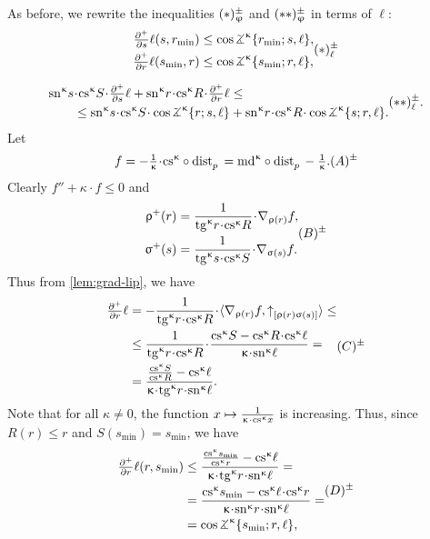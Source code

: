 As before, we rewrite the inequalities $(*)^{\pm}_\upvarphi$ and $(**)^{\pm}_\upvarphi$ in terms of $\ell$:
\[
\begin{aligned}
\tfrac{\partial^+}{\partial s}\ell(s,r_{\min})
&\le 
\cos\tangle\mc\kappa\{r_{\min};s,\ell\},
\\
\tfrac{\partial^+}{\partial r}\ell(s_{\min},r)
&\le 
\cos\tangle\mc\kappa\{s_{\min};r,\ell\},
\end{aligned}
\leqno(*)\mc\pm_\ell
\]

\[
\begin{aligned}
\sn\kappa s&\cdot\cs\kappa S\cdot\tfrac{\partial^+}{\partial s}\ell
+
\sn\kappa r\cdot\cs\kappa R\cdot\tfrac{\partial^+}{\partial r}\ell\le 
\\
&\le\sn\kappa s\cdot\cs\kappa S\cdot\cos\tangle\mc\kappa\{r;s,\ell\}
+
\sn\kappa r\cdot\cs\kappa R\cdot\cos\tangle\mc\kappa\{s;r,\ell\}.
\end{aligned}
\leqno(**)\mc\pm_\ell.
\]
Let
\[f=-\tfrac{1}{\kappa}\cdot\cs\kappa\circ\distfun{p}{}{}
=
\md\kappa\circ\distfun{p}{}{}-\tfrac{1}{\kappa}.\leqno(A)\mc\pm\]
Clearly $f''+\kappa\cdot  f\le 0$ and
\[
\begin{aligned}
\rho^+(r)&=\frac{1}{\tang\kappa r\cdot\cs\kappa R}\cdot\nabla_{\rho(r)} f,
\\
\sigma^+(s)&=\frac{1}{\tang\kappa s\cdot\cs\kappa S}\cdot\nabla_{\sigma(s)} f.
\end{aligned}
\leqno(B)\mc\pm\]
Thus from \ref{lem:grad-lip}, we have
\[\begin{aligned}
\tfrac{\partial^+}{\partial r}\ell
&=
-\frac{1}{\tang\kappa r\cdot\cs\kappa R}
\cdot
\<\nabla_{\rho(r)} f,\dir{\rho(r)}{\sigma(s)}\>
\le
\\
&\le
\frac
{1}
{\tang\kappa r\cdot\cs\kappa R}
\cdot
\frac
{\cs\kappa S-\cs\kappa R\cdot\cs\kappa\ell}
{\kappa\cdot\sn\kappa\ell}
=
\\
&=
\frac
{\frac{\cs\kappa S}{\cs\kappa R}-\cs\kappa\ell}
{\kappa\cdot\tang\kappa r\cdot\sn\kappa\ell}.
\end{aligned}
\leqno(C)\mc\pm\]
Note that for all $\kappa\ne 0$,
the function $x\mapsto\frac{1}{\kappa\cdot\cs\kappa x}$ is increasing.
Thus, since $R(r)\le r$ and $S(s_{\min})=s_{\min}$, we have 
\[\begin{aligned}
\tfrac{\partial^+}{\partial r}\ell(r,s_{\min})
&\le 
\frac
{\frac{\cs\kappa s_{\min}}{\cs\kappa r}-\cs\kappa\ell}
{\kappa\cdot\tang\kappa r\cdot\sn\kappa\ell}
=
\\
&=
\frac
{{\cs\kappa s_{\min}}-\cs\kappa\ell\cdot\cs\kappa r}
{\kappa\cdot\sn\kappa r\cdot\sn\kappa\ell}=
\\
&=\cos\tangle\mc\kappa\{s_{\min};r,\ell\},
  \end{aligned}\leqno(D)\mc\pm\]
